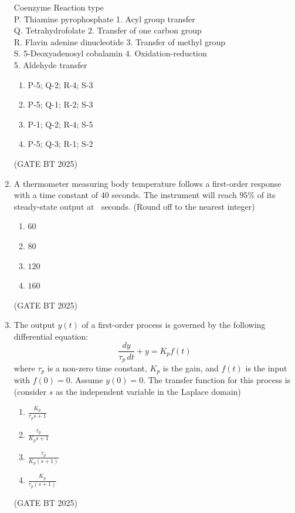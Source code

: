 \documentclass[journal,12pt,onecolumn]{IEEEtran}
\theoremstyle{remark}
\begin{document}
\begin{enumerate}
Coenzyme \hspace{1cm} Reaction type \\
P. Thiamine pyrophosphate \hspace{0.5cm} 1. Acyl group transfer \\
Q. Tetrahydrofolate \hspace{1.3cm} 2. Transfer of one carbon group \\
R. Flavin adenine dinucleotide \hspace{0.3cm} 3. Transfer of methyl group \\
S. 5-Deoxyadenosyl cobalamin \hspace{0.3cm} 4. Oxidation-reduction \\
\hspace{3cm} 5. Aldehyde transfer

\begin{enumerate}
    \item P-5; Q-2; R-4; S-3
    \item P-5; Q-1; R-2; S-3
    \item P-1; Q-2; R-4; S-5
    \item P-5; Q-3; R-1; S-2
\end{enumerate}
\hfill (GATE BT 2025)

\item A thermometer measuring body temperature follows a first-order response with a time constant of $40$ seconds. The instrument will reach $95\%$ of its steady-state output at $~$ seconds. (Round off to the nearest integer)

\begin{enumerate}
    \item $60$
    \item $80$
    \item $120$
    \item $160$
\end{enumerate}
\hfill (GATE BT 2025)

\item The output $y(t)$ of a first-order process is governed by the following differential equation:
\[
\frac{dy}{\tau_p \, dt} + y = K_p f(t)
\]
where $\tau_p$ is a non-zero time constant, $K_p$ is the gain, and $f(t)$ is the input with $f(0) = 0$. Assume $y(0) = 0$. The transfer function for this process is (consider $s$ as the independent variable in the Laplace domain)

\begin{enumerate}
    \item $\frac{K_p}{\tau_p s + 1}$
    \item $\frac{\tau_p}{K_p s + 1}$
    \item $\frac{\tau_p}{K_p (s + 1)}$
    \item $\frac{K_p}{\tau_p (s + 1)}$
\end{enumerate}
\hfill (GATE BT 2025)


\end{enumerate}
\end{document}
